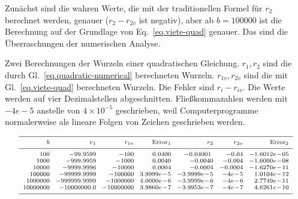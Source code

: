 Zunächst sind die wahren Werte, die mit der traditionellen Formel für $r_2$ berechnet werden, genauer ($r_2-r_{2v}$ ist negativ), aber ab $b=100000$ ist die Berechnung auf der Grundlage von Eq.~\ref{eq.viete-quad} genauer. Das sind die Überraschungen der numerischen Analyse.

\begin{table}[bht]
\caption[Zwei Berechnungen der Wurzeln einer quadratischen Gleichung]{Zwei Berechnungen der Wurzeln einer quadratischen Gleichung. $r_1,r_2$ sind die durch Gl.~\ref{eq.quadratic-numerical} berechneten Wurzeln. $r_{1v},r_{2v}$ sind die mit Gl.~\ref{eq.viete-quad} berechneten Wurzeln. Die Fehler sind $r_{i}-r_{iv}$. Die Werte werden auf vier Dezimalstellen abgeschnitten.
Fließkommazahlen werden mit $-4e-5$ anstelle von $4\times 10^{-5}$ geschrieben, weil Computerprogramme normalerweise als lineare Folgen von Zeichen geschrieben werden.} \label{t.quadratic}
\[
\begin{scriptsize}
\begin{array}{r@{\hspace{2.5mm}}r@{\hspace{2.5mm}}r@{\hspace{2.5mm}}r@{\hspace{2.5mm}}r@{\hspace{2.5mm}}r@{\hspace{2.5mm}}r}
\hline
\noalign{\smallskip}
b & r_1 & r_{1v} & \mathrm{Error}_1 & r_2 & r_{2v} & \mathrm{Error}_2\\
\noalign{\smallskip}\hline\noalign{\smallskip}
100  &  -99.9599  &  -100  &  0.0400  &  -0.04001\  &  -0.04  &  -1.6012e\!-\!05\\
1000  &  -999.9959  &  -1000  &  0.0040  &  -0.0040  &  -0.004  &  -1.6000e\!-\!08\\
10000  &  -9999.9996  &  -10000  &  0.0004  &  -0.0004  &  -0.0004  &  -1.6270e\!-\!11\\
100000  &  -99999.9999  &  -100000  &  3.9999e\!-\!5  &  -3.9999e\!-\!5  &  -4e\!-\!5  &  1.0104e\!-\!12\\
1000000  &  -999999.9999  &  -1000000  &  4.0000e\!-\!6  &  -3.9999e\!-\!6  &  -4e\!-\!6  &  2.7749e\!-\!11\\
10000000  &  -10000000.0  &  -10000000  &  3.9860e\!-\!7  &  -3.9953e\!-\!7  &  -4e\!-\!7  &  4.6261e\!-\!10\\
 \noalign{\smallskip}
 \hline
\end{array}
\end{scriptsize}
\]
\end{table}

